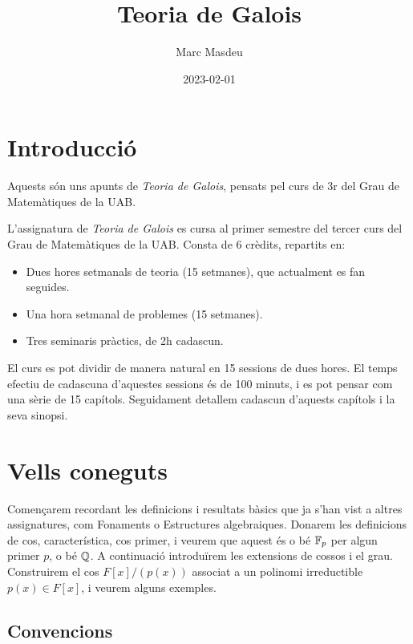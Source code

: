 \documentclass[
]{book}
\title{Teoria de Galois}
\author{Marc Masdeu}
\date{2023-02-01}
\providecommand{\tightlist}{%
  \setlength{\itemsep}{0pt}\setlength{\parskip}{0pt}}
\theoremstyle{definition}
\theoremstyle{definition}
\theoremstyle{definition}
\theoremstyle{definition}
\theoremstyle{remark}
\begin{document}
\maketitle

{
\setcounter{tocdepth}{1}
\tableofcontents
}
\hypertarget{introducciuxf3}{%
\chapter*{Introducció}\label{introducciuxf3}}

Aquests són uns apunts de \emph{Teoria de Galois}, pensats pel curs de 3r del Grau de Matemàtiques de la UAB.

L'assignatura de \emph{Teoria de Galois} es cursa al primer semestre del tercer curs del Grau de Matemàtiques de la UAB. Consta de 6 crèdits, repartits en:

\begin{itemize}
\tightlist
\item
  Dues hores setmanals de teoria (15 setmanes), que actualment es fan seguides.
\item
  Una hora setmanal de problemes (15 setmanes).
\item
  Tres seminaris pràctics, de 2h cadascun.
\end{itemize}

El curs es pot dividir de manera natural en 15 sessions de dues hores. El temps efectiu de cadascuna d'aquestes sessions és de 100 minuts, i es pot pensar com una sèrie de 15 capítols. Seguidament detallem cadascun d'aquests capítols i la seva sinopsi.

\hypertarget{pilot}{%
\chapter{Vells coneguts}\label{pilot}}

Començarem recordant les definicions i resultats bàsics que ja s'han vist a altres
assignatures, com Fonaments o Estructures algebraiques. Donarem les definicions de cos,
característica, cos primer, i veurem que aquest és o bé \(\mathbb{F}_p\) per algun primer \(p\), o bé \(\mathbb{Q}\).
A continuació introduïrem les extensions de cossos i el grau. Construirem el cos \(F[x]/(p(x))\) associat
a un polinomi irreductible \(p(x)\in F[x]\), i veurem alguns exemples.

\hypertarget{convencions}{%
\section{Convencions}\label{convencions}}
\end{document}
